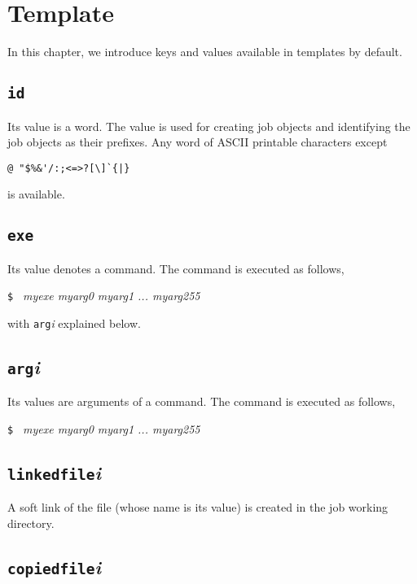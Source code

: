 \documentclass[a4paper,10pt]{report}
\begin{document}
\chapter{Template}\label{chapjobdefhash}

In this chapter, we introduce keys and values available in templates
by default.

\section{\texttt{id}}

Its value is a word.  The value is used for creating job objects and
identifying the job objects as their prefixes.  Any word of ASCII
printable characters except
\begin{center}
\verb*+@ "$%&'/:;<=>?[\]`{|}+        %
\end{center}
is available.

\section{\texttt{exe}}

Its value denotes a command.  The command is executed as follows,
\begin{screen}
\texttt{\$ } \textit{myexe myarg0 myarg1 ... myarg255}
\end{screen}
with \texttt{arg}\textit{i} explained below.

\section{\texttt{arg}\textit{i}}

Its values are arguments of a command.  The command is executed as
follows,
\begin{screen}
\texttt{\$ } \textit{myexe myarg0 myarg1 ... myarg255}
\end{screen}

\section{\texttt{linkedfile}\textit{i}}

A soft link of the file (whose name is its value) is created in the
job working directory.

\section{\texttt{copiedfile}\textit{i}}
\end{document}
